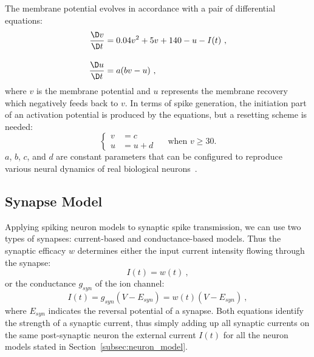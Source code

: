 The membrane potential evolves in accordance with a pair of differential equations:
\begin{equation}
\begin{aligned}
\dfrac{\D v}{\D t} &= 0.04v^2 + 5v + 140 - u - I(t)~,\\[10pt]
\dfrac{\D u}{\D t} &= a(bv - u)~,
\end{aligned}
\end{equation}
where $v$ is the membrane potential and $u$ represents the membrane recovery which negatively feeds back to $v$.
In terms of spike generation, the initiation part of an activation potential is produced by the equations, but a resetting scheme is needed:
\begin{equation}
\left\{
\begin{aligned}
v &= c \\
u &= u + d
\end{aligned}
\right.
\textrm{~~~~when~} v \geq 30.
\end{equation}  
$a$, $b$, $c$, and $d$ are constant parameters that can be configured to reproduce various neural dynamics of real biological neurons~\DIFdelbegin {}\DIFdelend \DIFaddbegin {}\DIFaddend .

\subsection{Synapse Model}
Applying spiking neuron models to synaptic spike transmission, we can use two types of synapses: current-based and conductance-based models.
Thus the synaptic efficacy $w$ determines either the input current intensity flowing through the synapse: %
\begin{equation}
I(t) = w(t)~,
\end{equation}
or the \DIFdelbegin {}\DIFdelend \DIFaddbegin {}\DIFaddend conductance $g_{syn}$ of the ion channel: %
\begin{equation}
I(t) = g_{syn} (V-E_{syn}) = w(t) (V-E_{syn})~,
\end{equation}
where $E_{syn}$ indicates the reversal potential of a synapse.
Both equations identify the strength of a synaptic current, thus simply adding up all synaptic currents on the same post-synaptic neuron \DIFdelbegin {}\DIFdelend \DIFaddbegin {}\DIFaddend the external current $I(t)$ for all the neuron models stated in Section~\ref{subsec:neuron_model}.


